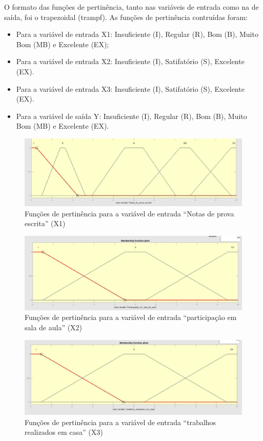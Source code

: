 \documentclass{article}
\begin{document}
O formato das funções de pertinência, tanto nas variáveis
de entrada como na de saída, foi o trapezoidal (trampf). As
funções de pertinência contruídas foram:

\begin{itemize}
    \item Para a variável de entrada X1: Insuficiente (I),
    Regular (R), Bom (B), Muito Bom (MB) e Excelente (EX);
    \item Para a variável de entrada X2:  Insuficiente  (I),
    Satifatório (S), Excelente (EX).
    \item Para a variável de entrada X3: Insuficiente  (I),
    Satifatório (S), Excelente (EX).
    \item Para a variável de saída Y: Insuficiente (I),
    Regular (R), Bom (B), Muito Bom (MB) e Excelente (EX).
\end{itemize}


\begin{figure}[h!]
\centering
\includegraphics[scale=.2]{X1.png}
\caption{Funções de pertinência para a variável de entrada
``Notas de prova escrita'' (X1)}
\label{fig:notas_de_provas_escritas}
\end{figure}


\begin{figure}[h!]
\centering
\includegraphics[scale=.2]{X2.png}
\caption{Funções de pertinência para a variável de entrada
``participação em sala de aula'' (X2)}
\label{fig:notas_de_provas_escritas}
\end{figure}

\begin{figure}[h!]
\centering
\includegraphics[scale=.2]{X3.png}
\caption{Funções de pertinência para a variável de entrada
``trabalhos realizados em casa'' (X3)}
\label{fig:notas_de_provas_escritas}
\end{figure}
\end{document}
